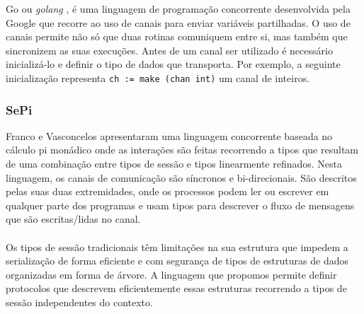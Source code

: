 Go ou \textit{golang} \cite{ref-go}, é uma linguagem de programação concorrente desenvolvida pela Google que recorre ao uso de canais para enviar variáveis partilhadas. O uso de canais permite não só que duas rotinas comuniquem entre si, mas também que sincronizem as suas execuções. Antes de um canal ser utilizado é necessário inicializá-lo e definir o tipo de dados que transporta. Por exemplo, a seguinte inicialização representa \lstinline"ch := make (chan int)" um canal de inteiros.

\subsubsection{SePi}
\label{sec:sepi}
\lstset{language=Sepi}
Franco e Vasconcelos \cite{ref-sepi} apresentaram uma linguagem concorrente baseada no cálculo pi monádico onde as interações são feitas recorrendo a tipos que resultam de uma combinação entre tipos de sessão e tipos linearmente refinados.
Nesta linguagem, os canais de comunicação são síncronos e bi-direcionais. São descritos pelas suas duas extremidades, onde os processos podem ler ou escrever em qualquer parte dos programas e usam tipos para descrever o fluxo de mensagens que são escritas/lidas no canal.

\paragraph{}Os tipos de sessão tradicionais têm limitações na sua estrutura que impedem a serialização de forma eficiente e com segurança de tipos de estruturas de dados organizadas em forma de árvore. A linguagem que propomos permite definir protocolos que descrevem eficientemente essas estruturas recorrendo a tipos de sessão independentes do contexto.


